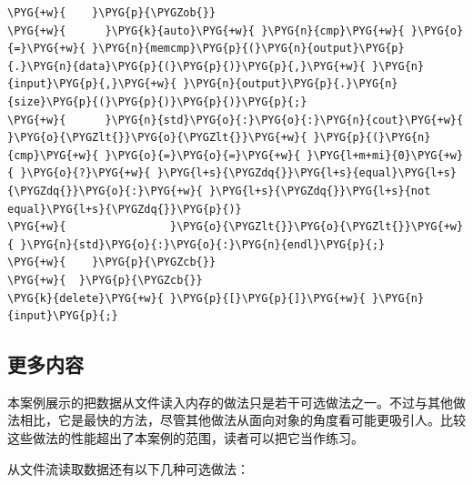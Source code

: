 \begin{codeblockbg}
\begin{Verbatim}[commandchars=\\\{\},breaklines=true,breakanywhere=true,fontsize=\codefont,xleftmargin=17bp]
\PYG{+w}{    }\PYG{p}{\PYGZob{}}
\PYG{+w}{      }\PYG{k}{auto}\PYG{+w}{ }\PYG{n}{cmp}\PYG{+w}{ }\PYG{o}{=}\PYG{+w}{ }\PYG{n}{memcmp}\PYG{p}{(}\PYG{n}{output}\PYG{p}{.}\PYG{n}{data}\PYG{p}{(}\PYG{p}{)}\PYG{p}{,}\PYG{+w}{ }\PYG{n}{input}\PYG{p}{,}\PYG{+w}{ }\PYG{n}{output}\PYG{p}{.}\PYG{n}{size}\PYG{p}{(}\PYG{p}{)}\PYG{p}{)}\PYG{p}{;}
\PYG{+w}{      }\PYG{n}{std}\PYG{o}{:}\PYG{o}{:}\PYG{n}{cout}\PYG{+w}{ }\PYG{o}{\PYGZlt{}}\PYG{o}{\PYGZlt{}}\PYG{+w}{ }\PYG{p}{(}\PYG{n}{cmp}\PYG{+w}{ }\PYG{o}{=}\PYG{o}{=}\PYG{+w}{ }\PYG{l+m+mi}{0}\PYG{+w}{ }\PYG{o}{?}\PYG{+w}{ }\PYG{l+s}{\PYGZdq{}}\PYG{l+s}{equal}\PYG{l+s}{\PYGZdq{}}\PYG{o}{:}\PYG{+w}{ }\PYG{l+s}{\PYGZdq{}}\PYG{l+s}{not equal}\PYG{l+s}{\PYGZdq{}}\PYG{p}{)}
\PYG{+w}{                }\PYG{o}{\PYGZlt{}}\PYG{o}{\PYGZlt{}}\PYG{+w}{ }\PYG{n}{std}\PYG{o}{:}\PYG{o}{:}\PYG{n}{endl}\PYG{p}{;}
\PYG{+w}{    }\PYG{p}{\PYGZcb{}}
\PYG{+w}{  }\PYG{p}{\PYGZcb{}}
\PYG{k}{delete}\PYG{+w}{ }\PYG{p}{[}\PYG{p}{]}\PYG{+w}{ }\PYG{n}{input}\PYG{p}{;}
\end{Verbatim}
\end{codeblockbg}



\subsection{更多内容}



本案例展示的把数据从文件读入内存的做法只是若干可选做法之一。不过与其他做法相比，它是最快的方法，尽管其他做法从面向对象的角度看可能更吸引人。比较这些做法的性能超出了本案例的范围，读者可以把它当作练习。



从文件流读取数据还有以下几种可选做法：




